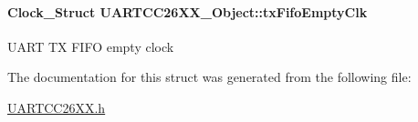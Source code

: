 \paragraph[{tx\+Fifo\+Empty\+Clk}]{\setlength{\rightskip}{0pt plus 5cm}Clock\+\_\+\+Struct U\+A\+R\+T\+C\+C26\+X\+X\+\_\+\+Object\+::tx\+Fifo\+Empty\+Clk}\label{struct_u_a_r_t_c_c26_x_x___object_a97be7390556f78f9361505c4ee860469}
U\+A\+R\+T T\+X F\+I\+F\+O empty clock 

The documentation for this struct was generated from the following file\+:\begin{DoxyCompactItemize}
\item 
\hyperlink{_u_a_r_t_c_c26_x_x_8h}{U\+A\+R\+T\+C\+C26\+X\+X.\+h}\end{DoxyCompactItemize}
